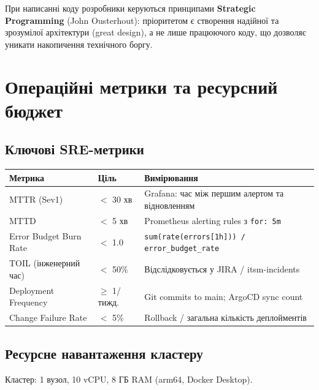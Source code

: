 \documentclass[12pt,a4paper]{article}
\begin{document}
При написанні коду розробники керуються принципами \textbf{Strategic Programming} (John Ousterhout): пріоритетом є створення надійної та зрозумілої архітектури (great design), а не лише працюючого коду, що дозволяє уникати накопичення технічного боргу.

\newpage
\section{Операційні метрики та ресурсний бюджет}

\subsection{Ключові SRE-метрики}

\begin{longtable}{L{4.5cm} C{3cm} L{6.5cm}}
\toprule
{}
\color{primary}\textbf{Метрика} &
\color{primary}\textbf{Ціль} &
\color{primary}\textbf{Вимірювання} \\
\midrule\endhead\bottomrule\endfoot
MTTR (Sev1)           & $<$ 30 хв & Grafana: час між першим алертом та відновленням \\[2pt]
MTTD  & $<$ 5 хв  & Prometheus alerting rules з \texttt{for: 5m} \\[2pt]
Error Budget Burn Rate & $<$ 1.0   & \texttt{sum(rate(errors[1h])) / error\_budget\_rate} \\[2pt]
TOIL (інженерний час) & $<$ 50\% & Відслідковується у JIRA / itsm-incidents \\[2pt]
Deployment Frequency  & $\geq$ 1/тижд. & Git commits to main; ArgoCD sync count \\[2pt]
Change Failure Rate & $<$ 5\% & Rollback / загальна кількість деплойментів \\[2pt]
\end{longtable}

\subsection{Ресурсне навантаження кластеру}

Кластер: 1 вузол, 10 vCPU, 8 ГБ RAM (arm64, Docker Desktop).
\end{document}

